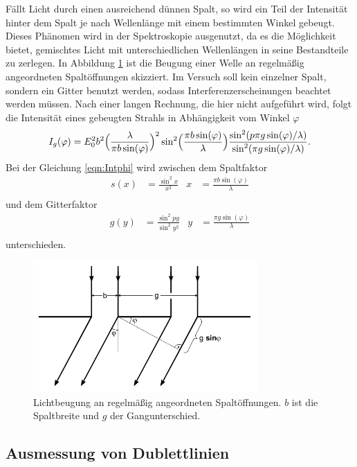 Fällt Licht durch einen ausreichend dünnen Spalt, so wird ein Teil der
Intensität hinter dem Spalt je nach Wellenlänge mit einem bestimmten Winkel
gebeugt. Dieses Phänomen wird in der Spektroskopie
ausgenutzt, da es die Möglichkeit bietet, gemischtes Licht mit
unterschiedlichen Wellenlängen in seine Bestandteile zu zerlegen.
In Abbildung \ref{fig:Beugitter} ist die Beugung einer
Welle an regelmäßig angeordneten Spaltöffnungen skizziert. Im Versuch soll
kein einzelner Spalt, sondern ein Gitter benutzt werden, sodass
Interferenzerscheinungen beachtet werden müssen.
Nach einer langen Rechnung, die hier nicht aufgeführt wird, folgt die
Intensität eines gebeugten Strahls in Abhängigkeit vom Winkel $\varphi$
\begin{equation}
  I_g(\varphi) = E_0^2 b^2 \Bigl(\frac{\lambda}{\pi b \sin(\varphi)}\Bigr)^2
  \sin^2\Bigl(\frac{\pi b \sin(\varphi)}{\lambda}\Bigr) \frac{\sin^2(p \pi g
  \sin (\varphi)/\lambda)}{\sin^2(\pi g \sin (\varphi)/\lambda)}.
  \label{eqn:Intphi}
\end{equation}
Bei der Gleichung \eqref{eqn:Intphi} wird zwischen dem Spaltfaktor
\begin{align}
  s(x) & = \frac{\sin^2 x}{x^2} & x & = \frac{\pi b \sin(\varphi)}{\lambda} \\
\end{align}
und dem Gitterfaktor
\begin{align}
  g(y) & = \frac{\sin^2 p y}{\sin^2 y^2} & y & = \frac{\pi g \sin(\varphi)}{\lambda} \\
\end{align}
unterschieden.

\begin{figure}
  \centering
  \includegraphics[height=5cm]{MeinFotoalbum:)/Spalt.png}
  \caption{Lichtbeugung an regelmäßig angeordneten Spaltöffnungen. $b$ ist die
  Spaltbreite und $g$ der Gangunterschied.\cite{anleitung}}
  \label{fig:Beugitter}
\end{figure}

\subsection{Ausmessung von Dublettlinien}
\label{sec:AvD}


